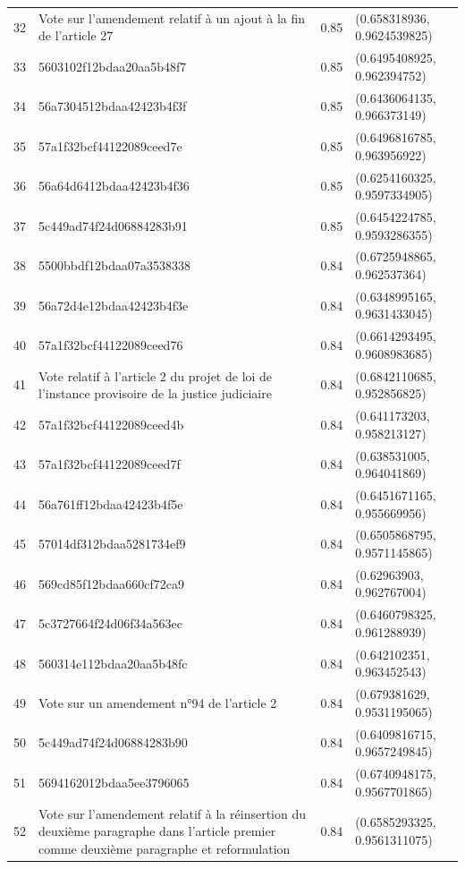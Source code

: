 \begin{table}[ht]
\begin{tabular}{rlrl}
  32 & Vote sur l'amendement relatif à un ajout à la fin de l'article 27 & 0.85 & (0.658318936, 0.9624539825) \\ 
  33 & 5603102f12bdaa20aa5b48f7 & 0.85 & (0.6495408925, 0.962394752) \\ 
  34 & 56a7304512bdaa42423b4f3f & 0.85 & (0.6436064135, 0.966373149) \\ 
  35 & 57a1f32bcf44122089ceed7e & 0.85 & (0.6496816785, 0.963956922) \\ 
  36 & 56a64d6412bdaa42423b4f36 & 0.85 & (0.6254160325, 0.9597334905) \\ 
  37 & 5c449ad74f24d06884283b91 & 0.85 & (0.6454224785, 0.9593286355) \\ 
  38 & 5500bbdf12bdaa07a3538338 & 0.84 & (0.6725948865, 0.962537364) \\ 
  39 & 56a72d4e12bdaa42423b4f3e & 0.84 & (0.6348995165, 0.9631433045) \\ 
  40 & 57a1f32bcf44122089ceed76 & 0.84 & (0.6614293495, 0.9608983685) \\ 
  41 & Vote relatif à l'article 2 du projet de loi de l'instance provisoire de la justice judiciaire & 0.84 & (0.6842110685, 0.952856825) \\ 
  42 & 57a1f32bcf44122089ceed4b & 0.84 & (0.641173203, 0.958213127) \\ 
  43 & 57a1f32bcf44122089ceed7f & 0.84 & (0.638531005, 0.964041869) \\ 
  44 & 56a761ff12bdaa42423b4f5e & 0.84 & (0.6451671165, 0.955669956) \\ 
  45 & 57014df312bdaa5281734ef9 & 0.84 & (0.6505868795, 0.9571145865) \\ 
  46 & 569cd85f12bdaa660cf72ca9 & 0.84 & (0.62963903, 0.962767004) \\ 
  47 & 5c3727664f24d06f34a563ec & 0.84 & (0.6460798325, 0.961288939) \\ 
  48 & 560314e112bdaa20aa5b48fc & 0.84 & (0.642102351, 0.963452543) \\ 
  49 & Vote sur un amendement n°94 de l'article 2 & 0.84 & (0.679381629, 0.9531195065) \\ 
  50 & 5c449ad74f24d06884283b90 & 0.84 & (0.6409816715, 0.9657249845) \\ 
  51 & 5694162012bdaa5ee3796065 & 0.84 & (0.6740948175, 0.9567701865) \\ 
  52 & Vote sur l'amendement relatif à la réinsertion du deuxième paragraphe dans l'article premier comme deuxième paragraphe et reformulation & 0.84 & (0.6585293325, 0.9561311075) \\ 

\end{tabular}
\end{table}
